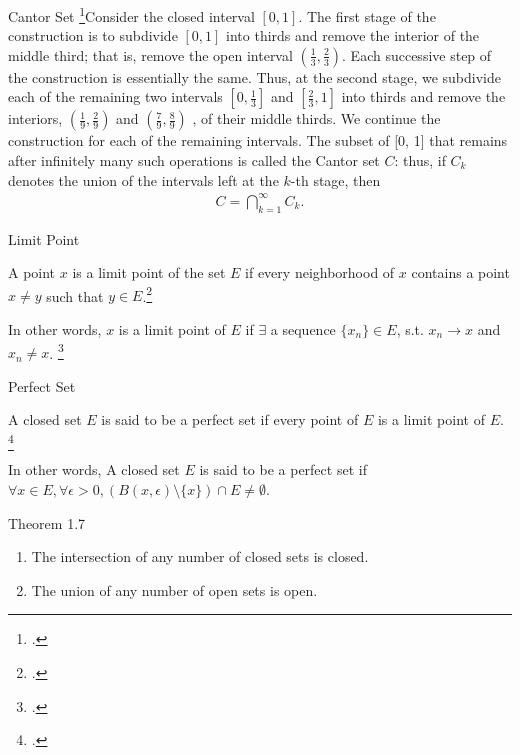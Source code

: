 \documentclass[UTF8,a4paper,10pt]{article}
\begin{document}
\pagebreak
  \begin{mybox}{Cantor Set}
    \footcite[][42-43]{Wheeden_Zygmund_2015}Consider the closed interval \([0, 1]\). The first stage of the construction is to
subdivide \([0, 1]\) into thirds and remove the interior of the middle third; that
is, remove the open interval \(\left(\frac{1}{3},\frac{2}{3}\right)\). Each successive step of the construction is essentially the same. Thus, at the second stage, we subdivide each of the
remaining two intervals \(\left[0,\frac{1}{3}\right]\)
and  \(\left[\frac{2}{3},1\right]\) into thirds and remove the interiors, \(\left(\frac{1}{9},\frac{2}{9}\right)\) and \(\left(\frac{7}{9},\frac{8}{9}\right)\)
, of their middle thirds. We continue the construction for each of the remaining intervals. The subset of [0, 1] that remains after infinitely many such operations is
called the Cantor set \(C\): thus, if \(C_k\) denotes the union of the intervals left at the
$k$-th stage, then
\begin{equation*}
  \begin{aligned}
    C =  \bigcap_{k=1}^{\infty} C_k  .
  \end{aligned}
\end{equation*}

  \end{mybox}

  \begin{mybox}{Limit Point}

 
    A point \(x\) is a limit point of the set \(E\) if every neighborhood of \(x\)
contains a point \(x\neq y\) such that \(y\in E\).\footcite[][32]{rudin1976principles}  


In other words, \(x\) is a limit point of \(E\) if \(\exists\) a sequence \(\{x_n\}\in E\), s.t. \(x_n\to x\) and \(x_n\neq x\).    \footcite[][3-4]{Wheeden_Zygmund_2015} 
  \end{mybox}

  \begin{mybox}{Perfect Set}


    A closed set \(E\) is said to be a perfect set if every point of \(E\) is a limit point of \(E\).    \footcite[][7]{Wheeden_Zygmund_2015}

    In other words, A closed set \(E\) is said to be a perfect set if \(\forall x\in E, \forall \epsilon>0, (B(x,\epsilon)\setminus \{x\})\cap E\neq \emptyset \).

  \end{mybox}


  \begin{mybox}{Theorem 1.7}
    \begin{enumerate}[label=(\roman*)]
      \item The intersection of any number of closed sets is closed.
      \item The union of any number of open sets is open.
    \end{enumerate}
  \end{mybox}
\end{document}
